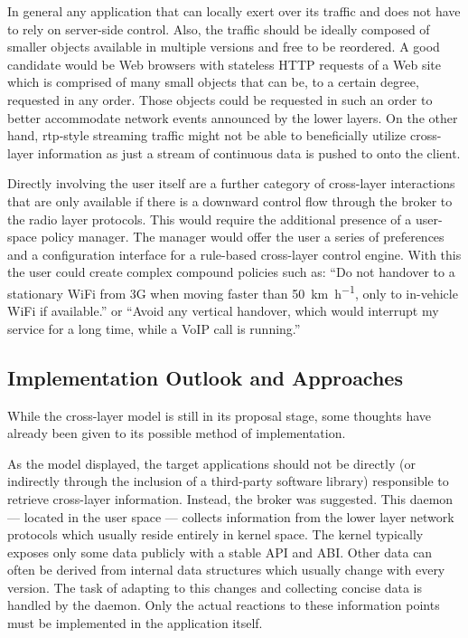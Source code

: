 In general any application that can locally exert over its traffic and does not have to rely on server-side control. Also, the traffic should be ideally composed of smaller objects available in multiple versions and free to be reordered. A good candidate would be Web browsers with stateless \gls{HTTP} requests of a Web site which is comprised of many small objects that can be, to a certain degree, requested in any order. Those objects could be requested in such an order to better accommodate network events announced by the lower layers. On the other hand, \gls{rtp}-style streaming traffic might not be able to beneficially utilize cross-layer information as just a stream of continuous data is pushed to onto the client.

Directly involving the user itself are a further category of cross-layer interactions that are only available if there is a downward control flow through the broker to the radio layer protocols. This would require the additional presence of a user-space policy manager. The manager would offer the user a series of preferences and a configuration interface for a rule-based cross-layer control engine. With this the user could create complex compound policies such as: ``Do not handover to a stationary WiFi from \gls{3G} when moving faster than \SI{50}{\kilo\meter\per\hour}, only to in-vehicle WiFi if available.'' or ``Avoid any vertical handover, which would interrupt my service for a long time, while a VoIP call is running.''


\subsection{Implementation Outlook and Approaches}

While the cross-layer model is still in its proposal stage, some thoughts have already been given to its possible method of implementation.

As the model displayed, the target applications should not be directly (or indirectly through the inclusion of a third-party software library) responsible to retrieve cross-layer information. Instead, the broker was suggested. This daemon --- located in the user space --- collects information from the lower layer network protocols which usually reside entirely in kernel space. The kernel typically exposes only some data publicly with a stable \gls{API} and \gls{ABI}. Other data can often be derived from internal data structures which usually change with every version. The task of adapting to this changes and collecting concise data is handled by the daemon. Only the actual reactions to these information points must be implemented in the application itself.

